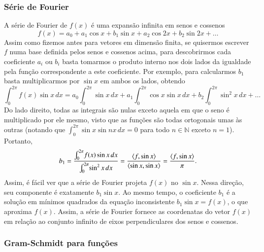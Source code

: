 \subsubsection{Série de Fourier}

A série de Fourier de $f(x)$ é uma expansão infinita em senos e cossenos
\begin{equation*}
	f(x) = a_0 + a_1\cos{x} + b_1 \sin{x} + a_2\cos{2x} + b_2\sin{2x}+\ldots
\end{equation*}
Assim como fizemos antes para vetores em dimensão finita, se quisermos escrever $f$ numa base definida pelos senos e cossenos acima, para descobrirmos cada coeficiente $a_i$ ou $b_i$ basta tomarmos o produto interno nos dois lados da igualdade pela função correspondente a este coeficiente. Por exemplo, para calcularmos $b_1$ basta multiplicarmos por $\sin{x}$ em ambos os lados, obtendo
\begin{equation*}
  \int_0^{2\pi} \! f(x)\sin{x}\, dx = a_0 \int_0^{2\pi} \! \sin{x} \, dx + a_1\int_0^{2\pi}\! \cos{x}\sin{x} \, dx + b_2 \int_0^{2\pi} \! \sin^2{x}\, dx + \ldots
\end{equation*}
Do lado direito, todas as integrais são nulas exceto aquela em que o seno é multiplicado por ele mesmo, visto que as funções são todas ortogonais umas às outras (notando que $\int_0^{2\pi}\! \sin{x}\sin{nx}\, dx = 0$ para todo $n\in {\mathbb{N}}$ exceto $n=1$). Portanto,
\begin{equation*}
  b_1 = \frac{\int_0^{2\pi}\! f(x)\sin{x}\, dx}{\int_0^{2\pi}\! \sin^2{x}\, dx} = \frac{\langle f, \sin{x} \rangle}{\langle \sin{x}, \sin{x} \rangle} = \frac{\langle f, \sin{x} \rangle}{\pi}.
\end{equation*}
Assim, é fácil ver que a série de Fourier projeta $f(x)$ no $\sin{x}$. Nessa direção, seu componente é exatamente $b_1\sin{x}$. Ao mesmo tempo, o coeficiente $b_1$ é a solução em mínimos quadrados da equação inconsistente $b_1\sin{x}=f(x)$, o que aproxima $f(x)$. Assim, a série de Fourier fornece as coordenatas do vetor $f(x)$ em relação ao conjunto infinito de eixos perpendiculares dos senos e cossenos.

\subsubsection{Gram-Schmidt para funções}

